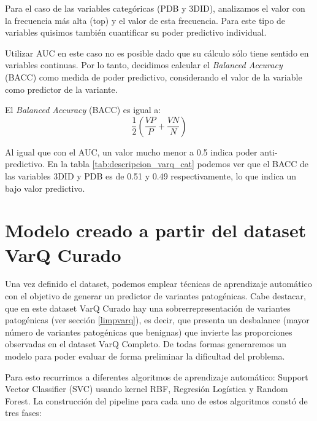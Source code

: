 Para el caso de las variables categóricas (PDB y 3DID), analizamos el valor con la frecuencia más alta (top) y el valor de esta frecuencia. Para este tipo de variables quisimos también cuantificar su poder predictivo individual. 


Utilizar AUC en este caso no es posible dado que su cálculo sólo tiene sentido en variables continuas. Por lo tanto, decidimos calcular el \textit{Balanced Accuracy} (BACC) \cite{Brodersen2010} como medida de poder predictivo, considerando el valor de la variable como predictor de la variante.

El \textit{Balanced Accuracy} (BACC) es igual a:
\begin{equation*}
    \frac{1}{2} (\frac{VP}{P} + \frac{VN}{N})
\end{equation*}

Al igual que con el AUC, un valor mucho menor a 0.5 indica poder anti-predictivo. En la tabla \ref{tab:descripcion_varq_cat} podemos ver que el BACC de las variables 3DID y PDB es de 0.51 y 0.49 respectivamente, lo que indica un bajo valor predictivo. 


\section{Modelo creado a partir del dataset VarQ Curado}

Una vez definido el dataset, podemos emplear técnicas de aprendizaje automático con el objetivo de generar un predictor de variantes patogénicas. Cabe destacar, que en este dataset VarQ Curado hay una sobrerrepresentación de variantes patogénicas (ver sección \ref{limpvarq}), es decir, que presenta un desbalance (mayor número de variantes patogénicas que benignas) que invierte las proporciones observadas en el dataset VarQ Completo. De todas formas generaremos un modelo para poder evaluar de forma preliminar la dificultad del problema. 

Para esto recurrimos a diferentes algoritmos de aprendizaje automático: Support Vector Classifier (SVC) usando kernel RBF, Regresión Logística y Random Forest. La construcción del pipeline para cada uno de estos algoritmos constó de tres fases: 

